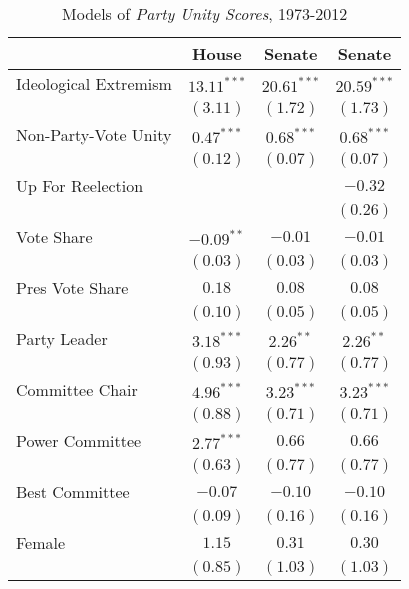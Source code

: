 \documentclass[12pt]{article}
\begin{document}
\begin{table}[!htbp]
\centering
\begin{threeparttable}
\caption{Models of \textit{Party Unity Scores}, 1973-2012}
\label{tab-party-unity-regressions}
\singlespacing
\begin{tabular}{l c c c }
\hline
& House & Senate & Senate \\
\hline
Ideological Extremism & $13.11^{***}$ & $20.61^{***}$ & $20.59^{***}$ \\
                      & $(3.11)$      & $(1.72)$      & $(1.73)$      \\
Non-Party-Vote Unity  & $0.47^{***}$  & $0.68^{***}$  & $0.68^{***}$  \\
                      & $(0.12)$      & $(0.07)$      & $(0.07)$      \\
Up For Reelection     &               &               & $-0.32$       \\
                      &               &               & $(0.26)$      \\
Vote Share            & $-0.09^{**}$  & $-0.01$       & $-0.01$       \\
                      & $(0.03)$      & $(0.03)$      & $(0.03)$      \\
Pres Vote Share       & $0.18$        & $0.08$        & $0.08$        \\
                      & $(0.10)$      & $(0.05)$      & $(0.05)$      \\
Party Leader          & $3.18^{***}$  & $2.26^{**}$   & $2.26^{**}$   \\
                      & $(0.93)$      & $(0.77)$      & $(0.77)$      \\
Committee Chair       & $4.96^{***}$  & $3.23^{***}$  & $3.23^{***}$  \\
                      & $(0.88)$      & $(0.71)$      & $(0.71)$      \\
Power Committee       & $2.77^{***}$  & $0.66$        & $0.66$        \\
                      & $(0.63)$      & $(0.77)$      & $(0.77)$      \\
Best Committee        & $-0.07$       & $-0.10$       & $-0.10$       \\
                      & $(0.09)$      & $(0.16)$      & $(0.16)$      \\
Female                & $1.15$        & $0.31$        & $0.30$        \\
                      & $(0.85)$      & $(1.03)$      & $(1.03)$      \\

\end{tabular}
\end{threeparttable}
\end{table}
\end{document}

